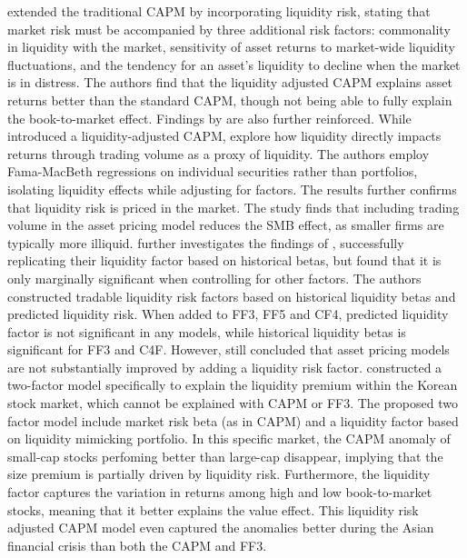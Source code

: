  extended the traditional CAPM by incorporating liquidity risk, stating that market risk must be accompanied by three additional risk factors: commonality in liquidity with the market, sensitivity of asset returns to market-wide liquidity fluctuations, and the tendency for an asset's liquidity to decline when the market is in distress. The authors find that the liquidity adjusted CAPM explains asset returns better than the standard CAPM, though not being able to fully explain the book-to-market effect. Findings by  are also further reinforced. While  introduced a liquidity-adjusted CAPM, explore how liquidity directly impacts returns through trading volume as a proxy of liquidity. The authors employ Fama-MacBeth regressions on individual securities rather than portfolios, isolating liquidity effects while adjusting for  factors. The results further confirms that liquidity risk is priced in the market. The study finds that including trading volume in the asset pricing model reduces the SMB effect, as smaller firms are typically more illiquid.  further investigates the findings of , successfully replicating their liquidity factor based on historical betas, but found that it is only marginally significant when controlling for other factors. The authors constructed tradable liquidity risk factors based on historical liquidity betas and predicted liquidity risk. When added to FF3, FF5 and CF4, predicted liquidity factor is not significant in any models, while historical liquidity betas is significant for FF3 and C4F. However,  still concluded that asset pricing models are not substantially improved by adding a liquidity risk factor.  constructed a two-factor model specifically to explain the liquidity premium within the Korean stock market, which cannot be explained with CAPM or FF3. The proposed two factor model include market risk beta (as in CAPM) and a liquidity factor based on liquidity mimicking portfolio. In this specific market, the CAPM anomaly of small-cap stocks perfoming better than large-cap disappear, implying that the size premium is partially driven by liquidity risk. Furthermore, the liquidity factor captures the variation in returns among high and low book-to-market stocks, meaning that it better explains the value effect. This liquidity risk adjusted CAPM model even captured the anomalies better during the Asian financial crisis than both the CAPM and FF3.

